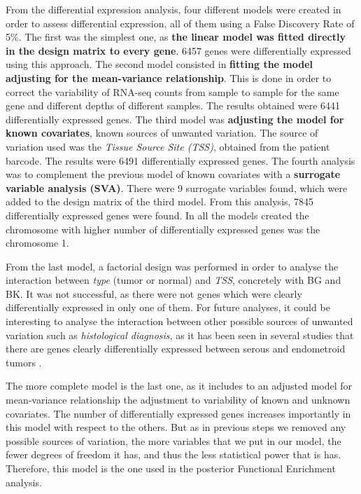 \documentclass[9pt,twocolumn,twoside]{gsajnl}
\begin{document}
From the differential expression analysis, four different models were created in order to assess differential expression, all of them using a False Discovery Rate of 5\%. The first was the simplest one, as \textbf{the linear model was fitted directly in the design matrix to every gene}. 6457 genes were differentially expressed using this approach. The second model consisted in \textbf{fitting the model adjusting for the mean-variance relationship}. This is done in order to correct the variability of RNA-seq counts from sample to sample for the same gene and different depths of different samples. The results obtained were 6441 differentially expressed genes. The third model was \textbf{adjusting the model for known covariates}, known sources of unwanted variation. The source of variation used was the \textit{Tissue Source Site (TSS)}, obtained from the patient barcode. The results were 6491 differentially expressed genes. The fourth analysis was to complement the previous model of known covariates with a \textbf{surrogate variable analysis (SVA)}. There were 9 surrogate variables found, which were added to the design matrix of the third model. From this analysis, 7845 differentially expressed genes were found. In all the models created the chromosome with higher number of differentially expressed genes was the chromosome 1.

From the last model, a factorial design was performed in order to analyse the interaction between \textit{type} (tumor or normal) and \textit{TSS}, concretely with BG and BK. It was not successful, as there were not genes which were clearly differentially expressed in only one 	of them. For future analyses, it could be interesting to analyse the interaction between other possible sources of unwanted variation such as \textit{histological diagnosis}, as it has been seen in several studies that there are genes clearly differentially expressed between serous and endometroid tumors \citep{Getz2013}.

The more complete model is the last one, as it includes to an adjusted model for mean-variance relationship the adjustment to variability of known and unknown covariates. The number of differentially expressed genes increases importantly in this model with respect to the others. But as in previous steps we removed any possible sources of variation, the more variables that we put in our model, the fewer degrees of freedom it has, and thus the less statistical power that is has. Therefore, this model is the one used in the posterior Functional Enrichment analysis.
\end{document}
